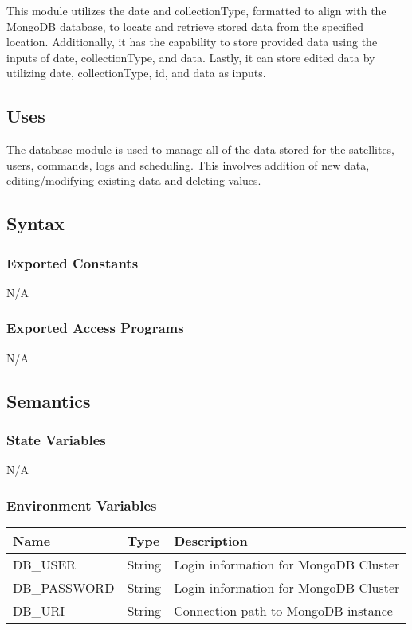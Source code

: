 \documentclass[12pt, titlepage]{article}
\begin{document}
This module utilizes the date and collectionType, formatted to align with the MongoDB database, to locate and retrieve stored data from the specified location. Additionally, it has the capability to store provided data using the inputs of date, collectionType, and data. Lastly, it can store edited data by utilizing date, collectionType, id, and data as inputs.

\subsection{ Uses}

The database module is used to manage all of the data stored for the satellites, users, commands, logs and scheduling. This involves addition of new data, editing/modifying existing data and deleting values.

\subsection{ Syntax}

\subsubsection{ Exported Constants}

N/A

\subsubsection{ Exported Access Programs}

N/A

\subsection{ Semantics}

\subsubsection{ State Variables}

N/A

\subsubsection{ Environment Variables}
\begin{center}
\begin{tabular}{p{4cm} p{4cm} p{4cm}}
\hline
\textbf{Name} & \textbf{Type} & \textbf{Description} \\
\hline
DB\_USER & String & Login information for MongoDB Cluster \\
\hline
DB\_PASSWORD & String & Login information for MongoDB Cluster \\
\hline
DB\_URI & String & Connection path to MongoDB instance \\
\hline
\end{tabular}
\end{center}
\end{document}
